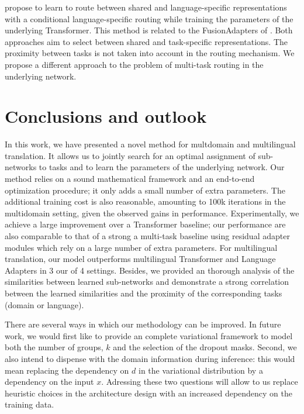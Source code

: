\documentclass[11pt]{article}
\newcommand{\fyDone}[1]{\done[FY]\Todo[FY:]{\textcolor{orange}{#1}}}
\begin{document}
\citet{biao21share} propose to learn to route between shared and language-specific representations with a conditional language-specific routing while training the parameters of the underlying Transformer. This method is related to the FusionAdapters of \citet{pfeiffer21adapterfusion}. Both approaches aim to select between shared and task-specific representations. The proximity between tasks is not taken into account in the routing mechanism. We propose a different approach to the problem of multi-task routing in the underlying network.

\section{Conclusions and outlook}\label{sec:conclusion}
In this work, we have presented a novel method for multdomain and multilingual translation. It allows us to jointly search for an optimal assignment of sub-networks to tasks and to learn the parameters of the underlying network. Our method relies on a sound mathematical framework and an end-to-end optimization procedure; it only adds a small number of extra parameters. The additional training cost is also reasonable, amounting to 100k iterations in the multidomain setting, given the observed gains in performance.\fyDone{There is a computational cost = 100k iterations} Experimentally, we achieve a large improvement over a Transformer baseline; our performance are also comparable to that of a strong a multi-task baseline using residual adapter modules which rely on a large number of extra parameters. For multilingual translation, our model outperforms multilingual Transformer and Language Adapters in 3 our of 4 settings. Besides, we provided an thorough analysis of the similarities between learned sub-networks and demonstrate a strong correlation between the learned similarities and the proximity of the corresponding tasks (domain or language).

There are several ways in which our methodology can be improved. In future work, we would first like to provide an complete variational framework to model both the number of groups, $k$ and the selection of the dropout masks. Second, we also intend to dispense with the domain information during inference: this would mean replacing the dependency on $d$ in the variational distribution by a dependency on the input $x$. Adressing these two questions will allow to us replace heuristic choices in the architecture design with an increased dependency on the training data.
\end{document}
